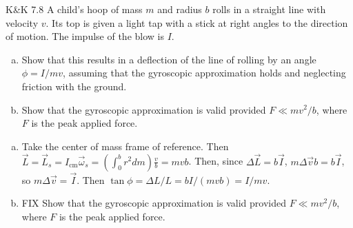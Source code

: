 \documentclass{esg8012pset}
\begin{document}
\begin{problem}{K\&K 7.8}
  A child's hoop of mass $m$ and radius $b$ rolls in a straight line with velocity $v$. Its top is given a light tap with a stick at right angles to the direction of motion. The impulse of the blow is $I$.
  \begin{enumerate}[(a)]
    \item Show that this results in a deflection of the line of rolling by an angle $\phi = I / m v$, assuming that the gyroscopic approximation holds and neglecting friction with the ground.
    \item Show that the gyroscopic approximation is valid provided $F \ll mv^2 / b$, where $F$ is the peak applied force.
  \end{enumerate}
\end{problem}
\begin{solution}
\begin{enumerate}[(a)]
  \item Take the center of mass frame of reference.  Then $\vec L = \vec  L_s = I_\text{cm}\vec \omega_s = \left(\int_0^b r^2 d m\right) \frac{v}{b} = m v b$.  Then, since ${\Delta \vec L} = b \vec I$, $m\Delta\vec v b = b \vec I$, so $m\Delta\vec v = \vec I$.  Then $\tan\phi = \Delta L / L = b I / (m v b) = I / m v$.
  \item FIX Show that the gyroscopic approximation is valid provided $F \ll mv^2 / b$, where $F$ is the peak applied force.
\end{enumerate}
\end{solution}
\end{document}
